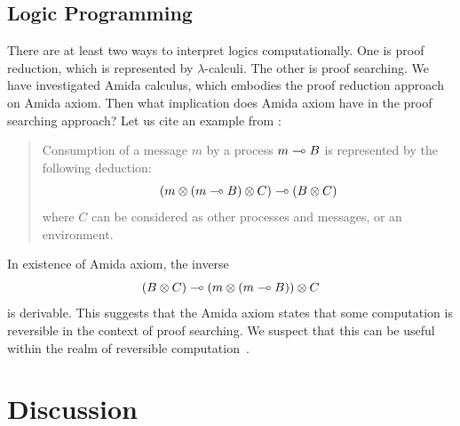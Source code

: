  \subsection{Logic Programming}

 There are at least two ways to interpret logics computationally.
 One is proof reduction, which is represented by $\lambda$-calculi.
 The other is proof searching.
 We have investigated Amida calculus, which embodies the proof reduction
 approach on Amida axiom.
 Then what implication does
 Amida axiom have in
 the proof searching approach?
 Let us cite an example from \citet[A.2]{kobayashi-yonezawa}:
 \begin{quote}
  Consumption of a message $m$ by a process $m\multimap B$ is represented by
  the following deduction:
  \[
   (m\otimes(m\multimap B)\otimes C)\multimap (B\otimes C)
  \]
  where $C$ can be considered as other processes and messages, or an environment.
 \end{quote}
 In existence of Amida axiom,
 the inverse
 \[
  (B\otimes C)\multimap (m\otimes (m\multimap B))\otimes C
 \]
 is derivable.
 This suggests that the Amida axiom states that some
 computation is reversible in the context of proof searching.
 We suspect that this can be
 useful within the realm of reversible computation~\citep{revcon}.

\section{Discussion}


